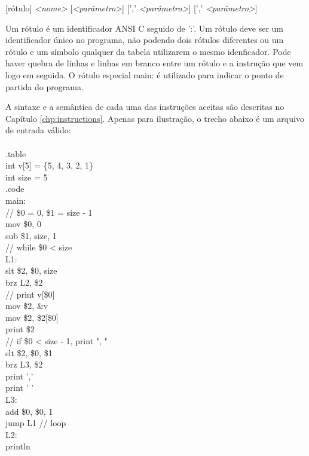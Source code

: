 \documentclass[12pt,a4paper,extrafontsizes,article]{memoir}
\newcommand*{\srcfont}{\fontfamily{pcr}\selectfont}
\begin{document}
\bigskip
{\srcfont\scriptsize [rótulo] \textit{<nome>} [\textit{<parâmetro>}] [',' \textit{<parâmetro>}] [','
\textit{<parâmetro>}]\color{red}{\char`\\n}}
\bigskip

Um rótulo é um identificador ANSI C seguido de {\srcfont ':'}. Um rótulo deve ser um identificador único no programa,
não podendo dois rótulos diferentes ou um rótulo e um símbolo qualquer da tabela utilizarem o mesmo idenficador. Pode
haver quebra de linhas e linhas em branco entre um rótulo e a instrução que vem logo em seguida. O rótulo especial
{\srcfont main:} é utilizado para indicar o ponto de partida do programa.

A sintaxe e a semântica de cada uma das instruções aceitas são descritas no Capítulo \ref{chp:instructions}. Apenas para
ilustração, o trecho abaixo é um arquivo de entrada válido:\\

{\srcfont
{}\\
{\color{gray}.table}\\
{\color{blue}int} v[5] = \{{\color{orange}5}, {\color{orange}4}, {\color{orange}3}, {\color{orange}2},
{\color{orange}1}\}\\
{\color{blue}int} size = {\color{orange}5}\\
{\color{gray}.code}\\
{\color{red}main:}\\
{\color{green!50!black}// \$0 = 0, \$1 = size - 1}\\
{\color{violet}mov} \$0, {\color{orange}0}\\
{\color{violet}sub} \$1, size, {\color{orange}1}\\
{\color{green!50!black}// while \$0 < size}\\
{\color{red}L1:}\\
{\color{violet}slt} \$2, \$0, size\\
{\color{violet}brz} L2, \$2\\
{\color{green!50!black}// print v[\$0]}\\
{\color{violet}mov} \$2, \&v\\
{\color{violet}mov} \$2, \$2[\$0]\\
{\color{violet}print} \$2\\
{\color{green!50!black}// if \$0 < size - 1, print ", "}\\
{\color{violet}slt} \$2, \$0, \$1\\
{\color{violet}brz} L3, \$2\\
{\color{violet}print} {\color{orange}','}\\
{\color{violet}print} {\color{orange}' '}\\
{\color{red}L3:}\\
{\color{violet}add} \$0, \$0, {\color{orange}1}\\
{\color{violet}jump} L1 {\color{green!50!black}// loop}\\
{\color{red}L2:}\\
{\color{violet}println}\\
}
\end{document}
